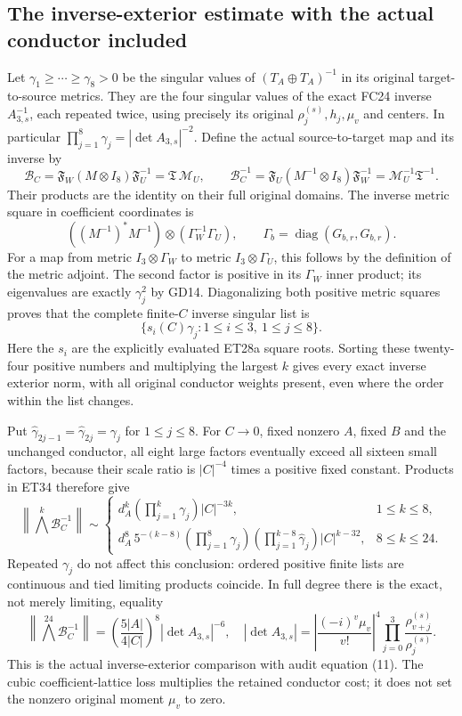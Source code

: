 \documentclass[11pt]{article}
\newcommand{\diag}{\operatorname{diag}}
\begin{document}
\subsection{The inverse-exterior estimate with the actual conductor included}
Let $\gamma_1\ge\cdots\ge\gamma_8>0$ be the singular values of
$(T_A\oplus T_A)^{-1}$ in its original target-to-source metrics.
They are the four singular values of the exact FC24 inverse
$A_{3,s}^{-1}$, each repeated twice, using precisely its original
$\rho_j^{(s)},h_j,\mu_v$ and centers. In particular
$\prod_{j=1}^8\gamma_j=|\det A_{3,s}|^{-2}$.
Define the actual source-to-target map and its inverse by
\[
 \mathcal B_C=\mathfrak F_W(M\otimes I_8)\mathfrak F_U^{-1}
             =\mathfrak T\,\mathcal M_U,\qquad
 \mathcal B_C^{-1}=\mathfrak F_U(M^{-1}\otimes I_8)
                  \mathfrak F_W^{-1}
             =\mathcal M_U^{-1}\mathfrak T^{-1}.
 \tag{ET32}
\]
Their products are the identity on their full original domains.
The inverse metric square in coefficient coordinates is
\[
 ((M^{-1})^*M^{-1})\otimes
       (\Gamma_W^{-1}\Gamma_U),\qquad
 \Gamma_b=\diag(G_{b,r},G_{b,r}) .
 \tag{ET33}
\]
For a map from metric $I_3\otimes\Gamma_W$ to metric
$I_3\otimes\Gamma_U$, this follows by the definition of the metric
adjoint. The second factor is positive in its $\Gamma_W$ inner product;
its eigenvalues are exactly $\gamma_j^2$ by GD14.
Diagonalizing both positive metric squares proves that the complete
finite-$C$ inverse singular list is
\[
 \{s_i(C)\gamma_j:1\le i\le3,\ 1\le j\le8\}.
 \tag{ET34}
\]
Here the $s_i$ are the explicitly evaluated ET28a square roots.
Sorting these twenty-four positive numbers and multiplying the largest
$k$ gives every exact inverse exterior norm, with all original conductor
weights present, even where the order within the list changes.

Put $\widehat\gamma_{2j-1}=\widehat\gamma_{2j}=\gamma_j$ for
$1\le j\le8$. For $C\to0$, fixed nonzero $A$, fixed $B$ and the
unchanged conductor, all eight large factors eventually exceed
all sixteen small factors, because their scale ratio is $|C|^{-4}$
times a positive fixed constant. Products in ET34 therefore give
\[
 \left\|\bigwedge^k\mathcal B_C^{-1}\right\|\sim
 \begin{cases}
 d_A^k\left(\prod_{j=1}^k\gamma_j\right)|C|^{-3k},
                    &1\le k\le8,\\[3pt]
 d_A^8\,5^{-(k-8)}
 \left(\prod_{j=1}^8\gamma_j\right)
 \left(\prod_{j=1}^{k-8}\widehat\gamma_j\right)|C|^{k-32},
                    &8\le k\le24 .
 \end{cases}
 \tag{ET35}
\]
Repeated $\gamma_j$ do not affect this conclusion: ordered positive
finite lists are continuous and tied limiting products coincide.
In full degree there is the exact, not merely limiting, equality
\[
 \left\|\bigwedge^{24}\mathcal B_C^{-1}\right\|
 =\left(\frac{5|A|}{4|C|}\right)^8|\det A_{3,s}|^{-6},
 \quad
 |\det A_{3,s}|=
 \left|\frac{(-i)^v\mu_v}{v!}\right|^4
 \prod_{j=0}^3\frac{\rho_{v+j}^{(s)}}{\rho_j^{(s)}} .
 \tag{ET36}
\]
This is the actual inverse-exterior comparison with audit equation (11).
The cubic coefficient-lattice loss multiplies the retained conductor
cost; it does not set the nonzero original moment $\mu_v$ to zero.
\end{document}
